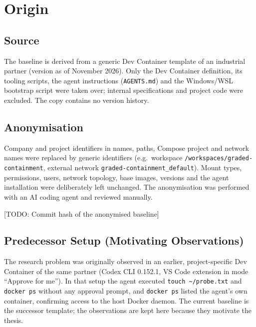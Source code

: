 \documentclass[11pt,a4paper]{article}
\newcommand{\todo}[1]{{\color{todo}\textsf{\small [TODO: #1]}}}
\newcommand{\fpath}[1]{\texttt{#1}}
\begin{document}
\section{Origin}

\subsection{Source}

The baseline is derived from a generic Dev Container template of an industrial partner (version as of November 2026). Only the Dev Container definition, its tooling scripts, the agent instructions (\fpath{AGENTS.md}) and the Windows/WSL bootstrap script were taken over; internal specifications and project code were excluded. The copy contains no version history.

\subsection{Anonymisation}

Company and project identifiers in names, paths, Compose project and network names were replaced by generic identifiers (e.g.\ workspace \fpath{/workspaces/graded-containment}, external network \fpath{graded-containment\_default}). Mount types, permissions, users, network topology, base images, versions and the agent installation were deliberately left unchanged. The anonymisation was performed with an AI coding agent and reviewed manually.

\todo{Commit hash of the anonymised baseline}

\subsection{Predecessor Setup (Motivating Observations)}

The research problem was originally observed in an earlier, project-specific Dev Container of the same partner (Codex CLI 0.152.1, VS Code extension in mode ``Approve for me''). In that setup the agent executed \texttt{touch \textasciitilde/probe.txt} and \texttt{docker ps} without any approval prompt, and \texttt{docker ps} listed the agent's own container, confirming access to the host Docker daemon. The current baseline is the successor template; the observations are kept here because they motivate the thesis.

\end{document}
